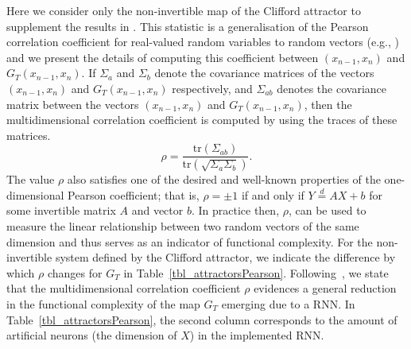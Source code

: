 Here we consider only the non-invertible map of the Clifford attractor to supplement the results in \cite{Supp}. 
This statistic is a generalisation of the Pearson correlation coefficient for real-valued random variables to random vectors (e.g., \cite{puccetti2019measuring}) and we present the details of computing this coefficient between $(x_{n-1},x_n)$ and $G_T(x_{n-1},x_n)$. 
If $\Sigma_{a}$ and $\Sigma_{b}$ denote the covariance matrices of the vectors $(x_{n-1},x_n)$ and $G_T(x_{n-1},x_n)$ respectively, and $\Sigma_{ab}$ denotes the covariance matrix between the vectors $(x_{n-1},x_n)$ and $G_T(x_{n-1},x_n)$, then the multidimensional correlation coefficient is computed by using the traces of these matrices.
\[
    \rho= \frac{\text{tr}({\Sigma_{ab}})}{\text{tr}({\sqrt{\Sigma_a\Sigma_b}})}.
\]
The value $\rho$ also satisfies one of the desired and well-known properties of the one-dimensional Pearson coefficient; that is, $\rho=\pm 1$ if and only if $Y\overset{d}{=}AX+b$ for some invertible matrix $A$ and vector $b$. 
In practice then, $\rho$, can be used to measure the linear relationship between two random vectors of the same dimension and thus serves as an indicator of functional complexity. 
For the non-invertible system defined by the Clifford attractor, we indicate the difference by which $\rho$ changes for $G_T$ in Table~\ref{tbl_attractorsPearson}.
Following~\cite{manjunath2021universal}, we state that the multidimensional correlation coefficient $\rho$ evidences a general reduction in the functional complexity of the map $G_T$ emerging due to a RNN. 
In Table~\ref{tbl_attractorsPearson}, the second column corresponds to the amount of artificial neurons (the dimension of $X$) in the implemented RNN.
               
